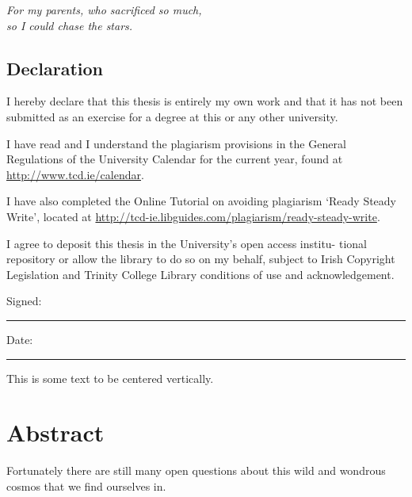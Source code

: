 \documentclass[a4paper]{book}
\numberwithin{equation}{section}
\begin{document}

\newpage %

\newpage
\thispagestyle{empty}
\vspace*{\fill}
\begin{center}
 \Large \textit{For my parents, who sacrificed so much,\\
  so I could chase the stars.}
\end{center}
\vspace*{\fill}

\newpage
\hspace{0pt}
\vfill
\section*{Declaration}
I hereby declare that this thesis is entirely my own work and that it has not been submitted as an exercise for a degree at this or any other university.

I have read and I understand the plagiarism provisions in the General Regulations of the University Calendar for the current year, found at \url{http://www.tcd.ie/calendar}.

I have also completed the Online Tutorial on avoiding plagiarism `Ready Steady Write', located at \url{http://tcd-ie.libguides.com/plagiarism/ready-steady-write}.

I agree to deposit this thesis in the University’s open access institu-
tional repository or allow the library to do so on my behalf, subject
to Irish Copyright Legislation and Trinity College Library conditions
of use and acknowledgement.
\vspace{1cm}

Signed:~\rule{5cm}{0.3pt}\hfill Date:~\rule{5cm}{0.3pt}

This is some text to be centered vertically.
\vfill
\hspace{0pt}




\newpage
\chapter*{Abstract}
Fortunately there are still many open questions about this wild and wondrous cosmos that we find ourselves in.
\end{document}
